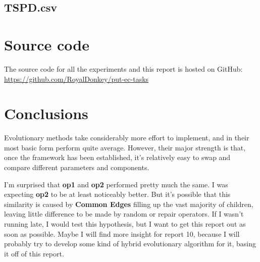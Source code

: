 \documentclass[14pt]{article}
\begin{document}
\subsection{TSPD.csv}

\section{Source code}
The source code for all the experiments and this report is hosted on GitHub: \\
\url{https://github.com/RoyalDonkey/put-ec-tasks}

\section{Conclusions}

Evolutionary methods take considerably more effort to implement, and in their
most basic form perform quite average. However, their major strength is that,
once the framework has been established, it's relatively easy to swap and
compare different parameters and components.

I'm surprised that \textbf{op1} and \textbf{op2} performed pretty much the
same. I was expecting \textbf{op2} to be at least noticeably better. But it's
possible that this similarity is caused by \textbf{Common Edges} filling up the
vast majority of children, leaving little difference to be made by random or
repair operators. If I wasn't running late, I would test this hypothesis, but I
want to get this report out as soon as possible. Maybe I will find more insight
for report 10, because I will probably try to develop some kind of hybrid
evolutionary algorithm for it, basing it off of this report.
\end{document}
